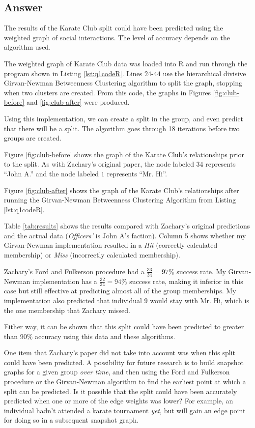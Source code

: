 \documentclass[letterpaper,11pt]{article}
\begin{document}
\newpage
\subsection*{Answer}

The results of the Karate Club split could have been predicted using the weighted graph of social interactions.  The level of accuracy depends on the algorithm used.

The weighted graph of Karate Club data was loaded into R and run through the program shown in Listing \ref{lst:q1codeR}.  Lines $24$-$44$ use the hierarchical divisive Girvan-Newman Betweenness Clustering algorithm to split the graph, stopping when two clusters are created.  From this code, the graphs in Figures \ref{fig:club-before} and \ref{fig:club-after} were produced.

Using this implementation, we can create a split in the group, and even predict that there will be a split.  The algorithm goes through 18 iterations before two groups are created.

Figure \ref{fig:club-before} shows the graph of the Karate Club's relationships prior to the split.  As with Zachary's original paper, the node labeled $34$ represents ``John A.'' and the node labeled $1$ represents ``Mr. Hi''.

Figure \ref{fig:club-after} shows the graph of the Karate Club's relationships after running the Girvan-Newman Betweenness Clustering Algorithm from Listing \ref{lst:q1codeR}.

Table \ref{tab:results} shows the results compared with Zachary's original predictions and the actual data (\emph{Officers'} is John A's faction).  Column 5 shows whether my Girvan-Newman implementation resulted in a \emph{Hit} (correctly calculated membership) or \emph{Miss} (incorrectly calculated membership).

Zachary's Ford and Fulkerson procedure had a $\frac{33}{34} = 97\%$ success rate.  My Girvan-Newman implementation has a $\frac{32}{34} = 94\%$ success rate, making it inferior in this case but still effective at predicting almost all of the group memberships.  My implementation also predicted that individual $9$ would stay with Mr. Hi, which is the one membership that Zachary missed.

Either way, it can be shown that this split could have been predicted to greater than $90\%$ accuracy using this data and these algorithms.

One item that Zachary's paper did not take into account was when this split could have been predicted.  A possibility for future research is to build snapshot graphs for a given group \emph{over time}, and then using the Ford and Fulkerson procedure or the Girvan-Newman algorithm to find the earliest point at which a split can be predicted.  Is it possible that the split could have been accurately predicted when one or more of the edge weights was lower?  For example, an individual hadn't attended a karate tournament \emph{yet}, but will gain an edge point for doing so in a subsequent snapshot graph.
\end{document}
